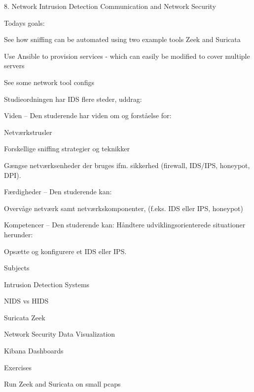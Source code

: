 \documentclass[Screen16to9,17pt]{foils}
\begin{document}
\mytitlepage
{8. Network Intrusion Detection}
{Communication and Network Security \the\year}



Todays goals:
\begin{list2}
\item See how sniffing can be automated using two example tools Zeek and Suricata
\item Use Ansible to provision services - which can easily be modified to cover multiple servers
\item See some network tool configs
\end{list2}


Studieordningen har IDS flere steder, uddrag:
\begin{list1}
\item Viden -- Den studerende har viden om og forståelse for:
\begin{list2}
\item Netværkstrusler
\item Forskellige sniffing strategier og teknikker
\item Gængse netværksenheder der bruges ifm. sikkerhed (firewall, IDS/IPS, honeypot,
DPI).
\end{list2}
\vskip 5mm
\item Færdigheder -- Den studerende kan:
\begin{list2}
\item Overvåge netværk samt netværkskomponenter, (f.eks. IDS eller IPS, honeypot)
\end{list2}
\vskip 5mm
\item Kompetencer -- Den studerende kan:
Håndtere udviklingsorienterede situationer herunder:
\begin{list2}
\item Opsætte og konfigurere et IDS eller IPS.
\end{list2}
\end{list1}





\begin{list1}
\item Subjects
\begin{list2}
\item Intrusion Detection Systems
\item NIDS vs HIDS
\item Suricata Zeek
\item Network Security Data Visualization
\item Kibana Dashboards
\end{list2}
\item Exercises
\begin{list2}
\item Run Zeek and Suricata on small pcaps
\end{list2}
\end{list1}
\end{document}
